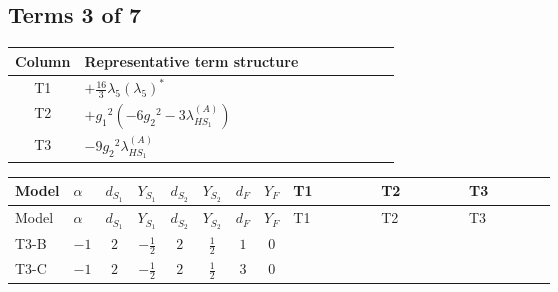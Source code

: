 \documentclass[8pt]{article}
\begin{document}
\begin{landscape}
\subsection*{Terms 3 of 7}
\begin{center}
\begin{tabular}{@{}c >{\raggedright\arraybackslash}p{0.82\linewidth}@{}}
\toprule
Column & Representative term structure \\
\midrule
T1 & \(\displaystyle +\frac{16}{3} {\lambda_5} \left({\lambda_5}\right)^{*}\) \\
\midrule
T2 & \(\displaystyle +{g_1}^2 \left(-6 {g_2}^2-3 {\lambda_{HS_1}^{(A)}}\right)\) \\
\midrule
T3 & \(\displaystyle -9 {g_2}^2 {\lambda_{HS_1}^{(A)}}\) \\
\midrule
\bottomrule
\end{tabular}
\end{center}
\smallskip
\tiny
\begin{longtable}{@{}llcccccc >{\raggedright\arraybackslash}p{0.21\linewidth} >{\raggedright\arraybackslash}p{0.21\linewidth} >{\raggedright\arraybackslash}p{0.21\linewidth}@{}}
\toprule
Model & $\alpha$ & $d_{S_1}$ & $Y_{S_1}$ & $d_{S_2}$ & $Y_{S_2}$ & $d_F$ & $Y_F$ & T1 & T2 & T3 \\
\midrule
\endfirsthead
\toprule
Model & $\alpha$ & $d_{S_1}$ & $Y_{S_1}$ & $d_{S_2}$ & $Y_{S_2}$ & $d_F$ & $Y_F$ & T1 & T2 & T3 \\
\midrule
\endhead
T3-B & $-1$ & $2$ & $-\frac{1}{2}$ & $2$ & $\frac{1}{2}$ & $1$ & $0$ & \scriptsize\adjustbox{max width=\linewidth}{$\begin{gathered} +\frac{16}{3} {\lambda_5} \left({\lambda_5}\right)^{*}\end{gathered}$} & \scriptsize\adjustbox{max width=\linewidth}{$\begin{gathered} +{g_1}^2 \left(-6 {g_2}^2-3 {\lambda_{HS_1}^{(A)}}\right)\end{gathered}$} & \scriptsize\adjustbox{max width=\linewidth}{$\begin{gathered} -9 {g_2}^2 {\lambda_{HS_1}^{(A)}}\end{gathered}$} \\
\midrule
T3-C & $-1$ & $2$ & $-\frac{1}{2}$ & $2$ & $\frac{1}{2}$ & $3$ & $0$ & \scriptsize\adjustbox{max width=\linewidth}{$\begin{gathered} +\frac{16}{3} {\lambda_5} \left({\lambda_5}\right)^{*}\end{gathered}$} & \scriptsize\adjustbox{max width=\linewidth}{$\begin{gathered} +{g_1}^2 \left(-6 {g_2}^2-3 {\lambda_{HS_1}^{(A)}}\right)\end{gathered}$} & \scriptsize\adjustbox{max width=\linewidth}{$\begin{gathered} -9 {g_2}^2 {\lambda_{HS_1}^{(A)}}\end{gathered}$} \\

\end{longtable}
\end{landscape}
\end{document}
